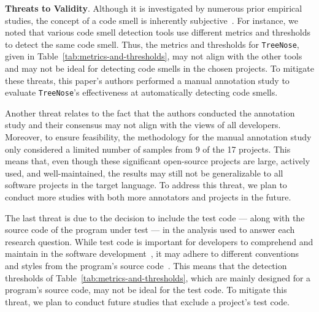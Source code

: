 {\bf Threats to Validity}.
%
Although it is investigated by numerous prior empirical studies, the concept of
a code smell is inherently subjective~\cite{Fowler_Beck}.
%
For instance, we noted that various code smell detection tools use different
metrics and thresholds to detect the same code smell. Thus, the metrics and
thresholds for \texttt{TreeNose}, given in
Table~\ref{tab:metrics-and-thresholds}, may not align with the other tools and
may not be ideal for detecting code smells in the chosen projects.
%
%
To mitigate these threats, this paper's authors performed a manual annotation
study to evaluate \texttt{TreeNose}'s effectiveness at automatically detecting
code smells.

%
Another threat relates to the fact that the authors conducted the annotation
study and their consensus may not align with the views of all developers.
%
Moreover, to ensure feasibility, the methodology for the manual annotation study
only considered a limited number of samples from 9 of the 17 projects.
%
This means that, even though these significant open-source projects are large,
actively used, and well-maintained, the results may still not be generalizable
to all software projects in the target language. To address this threat, we plan
to conduct more studies with both more annotators and projects in the future.






The last threat is due to the decision to include the test code --- along with
the source code of the program under test --- in the analysis used to answer
each research question. While test code is important for developers to
comprehend and maintain in the software development~\cite{ML}, it may adhere to
different conventions and styles from the program's source
code~\cite{Kapfhammer2004,Kapfhammer2010}. This means that the detection
thresholds of Table~\ref{tab:metrics-and-thresholds}, which are mainly designed
for a program's source code, may not be ideal for the test code. To mitigate
this threat, we plan to conduct future studies that exclude a project's test
code.
